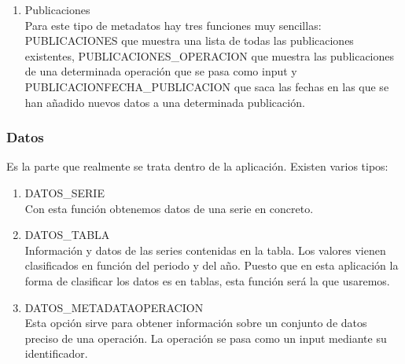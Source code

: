 \begin{enumerate}
    \item Publicaciones\\
    Para este tipo de metadatos hay tres funciones muy sencillas: PUBLICACIONES que muestra una lista de todas las publicaciones existentes, PUBLICACIONES\_OPERACION que muestra las publicaciones de una determinada operación que se pasa como input y PUBLICACIONFECHA\_PUBLICACION que saca las fechas en las que se han añadido nuevos datos a una determinada publicación.\\
\end{enumerate}
\subsubsection{Datos}
Es la parte que realmente se trata dentro de la aplicación. Existen varios tipos:\\
\begin{enumerate}
    \item DATOS\_SERIE\\
    Con esta función obtenemos datos de una serie en concreto.\\
    \item DATOS\_TABLA\\
     Información y datos de las series contenidas en la tabla. Los valores vienen clasificados en función del periodo y del año. Puesto que en esta aplicación la forma de clasificar los datos es en tablas, esta función será la que usaremos.\\ 
     \item DATOS\_METADATAOPERACION\\
      Esta opción sirve para obtener información sobre un conjunto de datos preciso de una operación. La operación se pasa como un input mediante su identificador.\\
\end{enumerate}



 
